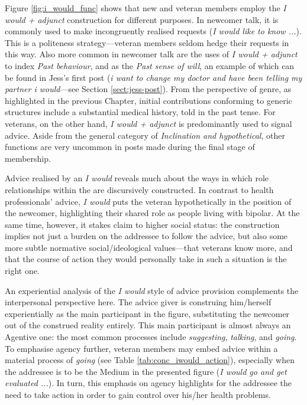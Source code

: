 Figure \ref{fig:i_would_func} shows that new and veteran members employ the \emph{I would + adjunct} construction for different purposes. In newcomer talk, it is commonly used to make incongruently realised requests (\emph{I would like to know ...}). This is a politeness strategy---veteran members seldom hedge their requests in this way. Also more common in newcomer talk are the uses of \emph{I would + adjunct} to index \emph{Past behaviour}, and as the \emph{Past sense of will}, an example of which can be found in Jess's first \gls{post} (\emph{i want to change my doctor and have been telling my partner i would}---see Section \ref{sect:jess-post}). From the perspective of genre, as highlighted in the previous Chapter, initial contributions conforming to generic structures include a substantial medical history, told in the past tense. For veterans, on the other hand, \emph{I would + adjunct} is predominantly used to signal advice. Aside from the general category of \emph{Inclination and hypothetical}, other functions are very uncommon in \glspl{post} made during the final stage of membership.


Advice realised by an \emph{I would} reveals much about the ways in which role relationships within the  are discursively constructed. In contrast to health professionals' advice, \emph{I would} puts the veteran hypothetically in the position of the newcomer, highlighting their shared role as people living with \gls{bipolar}. At the same time, however, it stakes claim to higher social status: the construction implies not just a burden on the addressee to follow the advice, but also some more subtle normative social\slash ideological values---that veterans know more, and that the course of action they would personally take in such a situation is the right one. 

An experiential analysis of the \emph{I would} style of advice provision complements the interpersonal perspective here. The advice giver is construing him\slash herself experientially as the main participant in the figure, substituting the newcomer out of the construed reality entirely. This main participant is almost always an Agentive one: the most common processes include \emph{suggesting}, \emph{talking}, and \emph{going}. To emphasise agency further, veteran \glspl{member} may embed advice within a material process of \emph{going} (see Table \ref{tab:conc_iwould_action}), especially when the addressee is to be the Medium in the presented figure (\emph{I would go and get evaluated ...}). In turn, this emphasis on agency highlights for the addressee the need to take action in order to gain control over his\slash her health problems.

